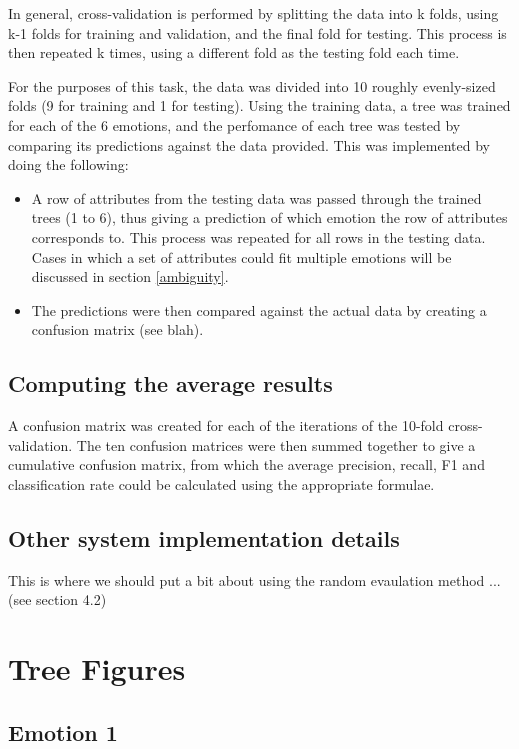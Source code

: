 \documentclass[a4paper,11pt]{article}
\begin{document}
In general, cross-validation is performed by splitting the data into k folds, using k-1 folds for training and validation, and the final fold for testing. This process is then repeated k times, using a different fold as the testing fold each time.

For the purposes of this task, the data was divided into 10 roughly evenly-sized folds (9 for training and 1 for testing). Using the training data, a tree was trained for each of the 6 emotions, and the perfomance of each tree was tested by comparing its predictions against the data provided. This was implemented by doing the following:

\begin{itemize}
	\item A row of attributes from the testing data was passed through the trained trees (1 to 6), thus giving a prediction of which emotion the row of attributes corresponds to. This process was repeated for all rows in the testing data. Cases in which a set of attributes could fit multiple emotions will be discussed in section \ref{ambiguity}.
	\item The predictions were then compared against the actual data by creating a confusion matrix (see blah).
\end{itemize}

\subsection{Computing the average results}

A confusion matrix was created for each of the iterations of the 10-fold cross-validation. The ten confusion matrices were then summed together to give a cumulative confusion matrix, from which the average precision, recall, F1 and classification rate could be calculated using the appropriate formulae.

\subsection{Other system implementation details}

This is where we should put a bit about using the random evaulation method ... (see section 4.2)

\section{Tree Figures}

\subsection{Emotion 1}
\end{document}
